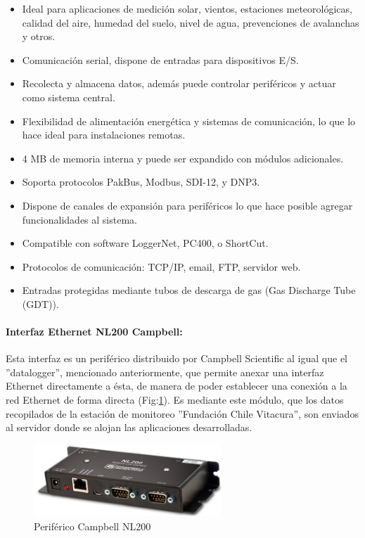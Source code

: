 \begin{itemize}
\item Ideal para aplicaciones de medición solar, vientos, estaciones meteorológicas, calidad del aire, humedad del suelo, nivel de agua, prevenciones de avalanchas y otros.
\item Comunicación serial, dispone de entradas para dispositivos E/S.
\item Recolecta y almacena datos, además puede controlar periféricos y actuar como sistema central.
\item Flexibilidad de alimentación energética y sistemas de comunicación, lo que lo hace ideal para instalaciones remotas.
\item 4 MB de memoria interna y puede ser expandido con módulos adicionales.
\item Soporta protocolos PakBus, Modbus, SDI-12, y DNP3.
\item Dispone de canales de expansión para periféricos lo que hace posible agregar funcionalidades al sistema.
\item Compatible con software LoggerNet, PC400, o ShortCut.
\item Protocolos de comunicación: TCP/IP, email, FTP, servidor web.
\item Entradas protegidas mediante tubos de descarga de gas (Gas Discharge Tube (GDT)).
\end{itemize}

\paragraph{Interfaz Ethernet NL200 Campbell:}
Esta interfaz es un periférico distribuido por Campbell Scientific al igual que el ''datalogger'', mencionado anteriormente, que permite anexar una interfaz Ethernet directamente a ésta, de manera de poder establecer una conexión a la red Ethernet de forma directa (Fig:\ref{nl200}). Es mediante este módulo, que los datos recopilados de la estación de monitoreo ''Fundación Chile Vitacura'', son enviados al servidor donde se alojan las aplicaciones desarrolladas.\\

\begin{figure}[h!]
        \centering
        \includegraphics[width=200pt]{images/nl200}
        \caption{Periférico Campbell NL200}
	\label{nl200} 
\end{figure}

